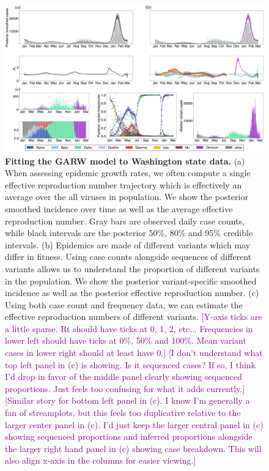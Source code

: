 \documentclass[11pt,oneside,letterpaper]{article}
\def\tbc#1{\textcolor{purple}{[#1]}}
\begin{document}
\begin{figure}[h!]
  \centering
  \includegraphics[width=\linewidth]{figs/GARW_rt_Washington.png}
  \caption{\textbf{Fitting the GARW model to Washington state data.}
    (a) When assessing epidemic growth rates, we often compute a single effective reproduction number trajectory which is effectively an average over the all viruses in population. We show the posterior smoothed incidence over time as well as the average effective reproduction number.
    Gray bars are observed daily case counts, while black intervals are the posterior 50\%, 80\% and 95\% credible intervals.
    (b) Epidemics are made of different variants which may differ in fitness. Using case counts alongside sequences of different variants allows us to understand the proportion of different variants in the population.
    We show the posterior variant-specific smoothed incidence as well as the posterior effective reproduction number.
    (c) Using both case count and frequency data, we can estimate the effective reproduction numbers of different variants.
    \tbc{Y-axis ticks are a little sparse. Rt should have ticks at 0, 1, 2, etc... Frequencies in lower left should have ticks at 0\%, 50\% and 100\%. Mean variant cases in lower right should at least have 0.}
    \tbc{I don't understand what top left panel in (c) is showing. Is it sequenced cases? If so, I think I'd drop in favor of the middle panel clearly showing sequenced proportions. Just feels too confusing for what it adds currently.}
    \tbc{Similar story for bottom left panel in (c). I know I'm generally a fan of streamplots, but this feels too duplicative relative to the larger center panel in (c). I'd just keep the larger central panel in (c) showing sequenced proportions and inferred proportions alongside the larger right hand panel in (c) showing case breakdown. This will also align x-axis in the columns for easier viewing.}
    }
  \label{fig:GARW_rt_Washington}
\end{figure}
\end{document}
